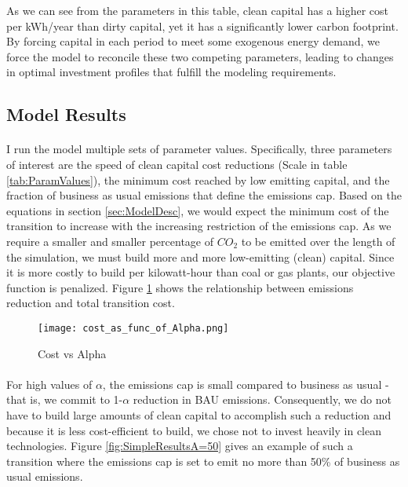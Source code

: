 \documentclass{article}
\begin{document}
As we can see from the parameters in this table, clean capital has a higher cost per kWh/year than dirty capital, yet it has a significantly lower carbon footprint. By forcing capital in each period to meet some exogenous energy demand, we force the model to reconcile these two competing parameters, leading to changes in optimal investment profiles that fulfill the modeling requirements.

\FloatBarrier


\subsection{Model Results}
\FloatBarrier

\paragraph{} I run the model multiple sets of parameter values. Specifically, three parameters of interest are the speed of clean capital cost reductions (Scale in table \ref{tab:ParamValues}), the minimum cost reached by low emitting capital, and the fraction of business as usual emissions that define the emissions cap. Based on the equations in section \ref{sec:ModelDesc}, we would expect the minimum cost of the transition to increase with the increasing restriction of the emissions cap. As we require a smaller and smaller percentage of $CO_2$ to be emitted over the length of the simulation, we must build more and more low-emitting (clean) capital. Since it is more costly to build per kilowatt-hour than coal or gas plants, our objective function is penalized. Figure \ref{fig:costVsAlpha} shows the relationship between emissions reduction and total transition cost. 

\begin{figure}[h]
\texttt{[image: cost\_as\_func\_of\_Alpha.png]}
\caption{Cost vs Alpha\label{fig:costVsAlpha}}
\end{figure}


\FloatBarrier

\paragraph{} For high values of $\alpha$, the emissions cap is small compared to business as usual - that is, we commit to 1-$\alpha$ reduction in BAU emissions. Consequently, we do not have to build large amounts of clean capital to accomplish such a reduction and because it is less cost-efficient to build, we chose not to invest heavily in clean technologies. Figure \ref{fig:SimpleResultsA=50} gives an example of such a transition where the emissions cap is set to emit no more than 50\% of business as usual emissions. 
\end{document}
